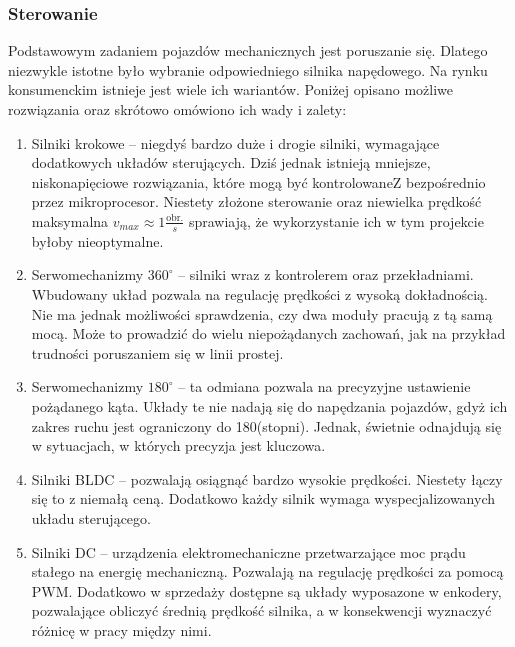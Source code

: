         \subsubsection{Sterowanie}
        \label{sec:engines}
            Podstawowym zadaniem pojazdów mechanicznych jest poruszanie się.
            Dlatego niezwykle istotne było wybranie odpowiedniego silnika napędowego.
            Na rynku konsumenckim istnieje jest wiele ich wariantów.
            Poniżej opisano możliwe rozwiązania oraz skrótowo omówiono ich wady i zalety:
            \begin{enumerate}
                \item Silniki krokowe -- niegdyś bardzo duże i drogie silniki, wymagające dodatkowych układów sterujących.
                Dziś jednak istnieją mniejsze, niskonapięciowe rozwiązania, które mogą być kontrolowaneZ bezpośrednio przez mikroprocesor.
                Niestety złożone sterowanie oraz niewielka prędkość maksymalna $v_{max} \approx 1 \frac{\text{obr.}}{s}$ sprawiają, że wykorzystanie ich w tym projekcie byłoby nieoptymalne.
                \item Serwomechanizmy $360^\circ$ -- silniki wraz z kontrolerem oraz przekładniami.
                Wbudowany układ pozwala na regulację prędkości z wysoką dokładnością.
                Nie ma jednak możliwości sprawdzenia, czy dwa moduły pracują z tą samą mocą.
                Może to prowadzić do wielu niepożądanych zachowań, jak na przykład trudności poruszaniem się w linii prostej.
                \item Serwomechanizmy $180^\circ$ -- ta odmiana pozwala na precyzyjne ustawienie pożądanego kąta.
                Układy te nie nadają się do napędzania pojazdów, gdyż ich zakres ruchu jest ograniczony do 180(stopni). Jednak, świetnie odnajdują się w sytuacjach, w których precyzja jest kluczowa.
                \item Silniki BLDC -- pozwalają osiągnąć bardzo wysokie prędkości.
                Niestety łączy się to z niemałą ceną.
                Dodatkowo każdy silnik wymaga wyspecjalizowanych układu sterującego.
                \item Silniki DC -- urządzenia elektromechaniczne przetwarzające moc prądu stałego na energię mechaniczną.
                Pozwalają na regulację prędkości za pomocą PWM.
                Dodatkowo w sprzedaży dostępne są układy wyposazone w enkodery, pozwalające obliczyć średnią prędkość silnika, a w konsekwencji wyznaczyć różnicę w pracy między nimi.
            \end{enumerate}
